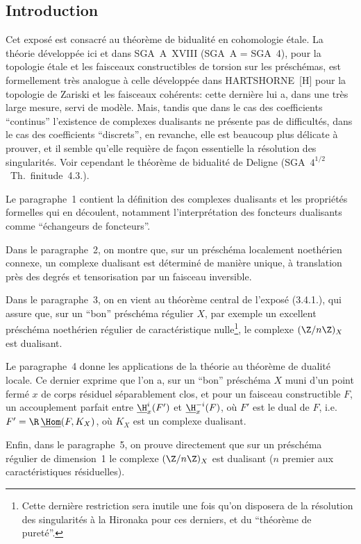 \subsection*{Introduction}

Cet exposé est consacré au théorème de bidualité en cohomologie étale. La théorie développée ici et dans SGA~A~XVIII (SGA~A = SGA~4), pour la topologie étale et les faisceaux constructibles de torsion sur les préschémas, est formellement très analogue à celle développée dans HARTSHORNE~[H] pour la topologie de Zariski et les faisceaux cohérents: cette dernière lui a, dans une très large mesure, servi de modèle. Mais, tandis que dans le cas des coefficients ``continus'' l'existence de complexes dualisants ne présente pas de difficultés, dans le cas des coefficients ``discrets'', en revanche, elle est beaucoup plus délicate à prouver, et il semble qu'elle requière de façon essentielle la résolution des singularités. Voir cependant le théorème de bidualité de Deligne (SGA~$4^{1/2}$~Th.~finitude~4.3.).

Le paragraphe~1 contient la définition des complexes dualisants et les propriétés formelles qui en découlent, notamment l'interprétation des foncteurs dualisants comme ``échangeurs de foncteurs''.

Dans le paragraphe~2, on montre que, sur un préschéma localement noethérien connexe, un complexe dualisant est déterminé de manière unique, à translation près des degrés et tensorisation par un faisceau inversible.

Dans le paragraphe~3, on en vient au théorème central de l'exposé (3.4.1.), qui assure que, sur un ``bon'' préschéma régulier $X$, par exemple un excellent préschéma noethérien régulier de caractéristique nulle\footnote{Cette dernière restriction sera inutile une fois qu'on disposera de la résolution des singularités à la Hironaka pour ces derniers, et du ``théorème de pureté''.}, le complexe $(\Z/n\Z)_X$ est dualisant.

Le paragraphe~4 donne les applications de la théorie au théorème de dualité locale. Ce dernier exprime que l'on a, sur un ``bon'' préschéma $X$ muni d'un point fermé $x$ de corps résiduel séparablement clos, et pour un faisceau constructible $F$, un accouplement parfait entre $\underline{\H}^i_x(F')$ et $\underline{\H}^{-i}_x(F)$, où $F'$ est le dual de $F$, i.e.\ $F' = \R\,\underline{\Hom}(F,K_X)$, où $K_X$ est un complexe dualisant.

Enfin, dans le paragraphe~5, on prouve directement que sur un préschéma régulier de dimension~1 le complexe $(\Z/n\Z)_X$ est dualisant ($n$ premier aux caractéristiques résiduelles).

